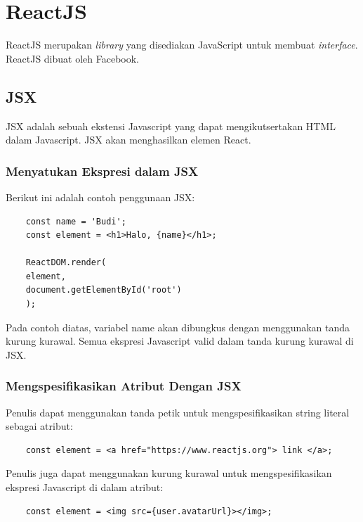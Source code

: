 \section{ReactJS\cite{reactjsConcept}}
ReactJS merupakan \textit{library} yang disediakan JavaScript untuk membuat \textit{interface}. ReactJS dibuat oleh Facebook. 
%

\subsection{JSX}
JSX adalah sebuah ekstensi Javascript yang dapat mengikutsertakan HTML dalam Javascript. JSX akan menghasilkan elemen React. 
\subsubsection{Menyatukan Ekspresi dalam JSX}
Berikut ini adalah contoh penggunaan JSX:
\begin{lstlisting}
	const name = 'Budi';
	const element = <h1>Halo, {name}</h1>;
	
	ReactDOM.render(
	element,
	document.getElementById('root')
	);
\end{lstlisting}
Pada contoh diatas, variabel name akan dibungkus dengan menggunakan tanda kurung kurawal. Semua ekspresi Javascript valid dalam tanda kurung kurawal di JSX. 
\subsubsection{Mengspesifikasikan Atribut Dengan JSX}
Penulis dapat menggunakan tanda petik untuk mengspesifikasikan string literal sebagai atribut:
\begin{lstlisting}
	const element = <a href="https://www.reactjs.org"> link </a>;
\end{lstlisting}
 Penulis juga dapat menggunakan kurung kurawal untuk mengspesifikasikan ekspresi Javascript di dalam atribut:
 \begin{lstlisting}
 	const element = <img src={user.avatarUrl}></img>;
 \end{lstlisting}

